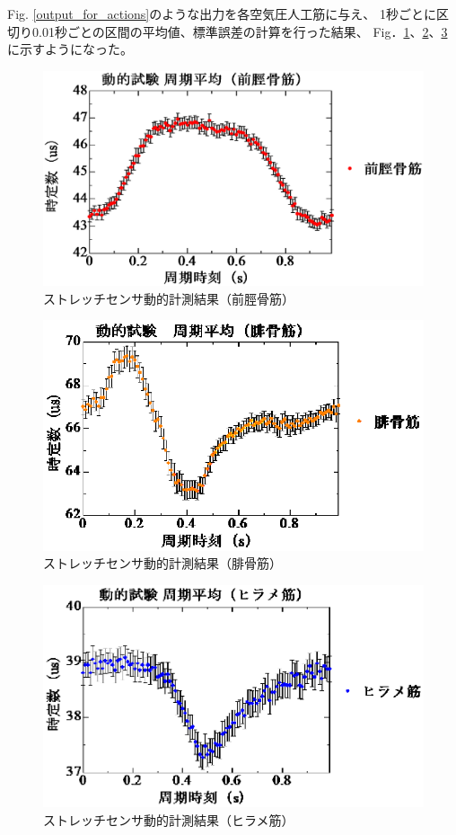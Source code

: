 Fig. \ref{output_for_actions}のような出力を各空気圧人工筋に与え、
1秒ごとに区切り0.01秒ごとの区間の平均値、標準誤差の計算を行った結果、
Fig．\ref{zenkei_action}、\ref{hikotsu_action}、\ref{hirame_action}に示すようになった。
\begin{figure}[h]
  \begin{center}
  \includegraphics[width=0.75\columnwidth,clip]{./4_consideration/moving/zenkei.eps}
  \caption{ストレッチセンサ動的計測結果（前脛骨筋）}
  \label{zenkei_action}
  \end{center}
\end{figure}
\begin{figure}[h]
  \begin{center}
  \includegraphics[width=0.75\columnwidth,clip]{./4_consideration/moving/hikotsu.eps}
  \caption{ストレッチセンサ動的計測結果（腓骨筋）}
  \label{hikotsu_action}
  \end{center}
\end{figure}

\clearpage

\begin{figure}[h]
  \begin{center}
  \includegraphics[width=0.75\columnwidth,clip]{./4_consideration/moving/hirame.eps}
  \caption{ストレッチセンサ動的計測結果（ヒラメ筋）}
  \label{hirame_action}
  \end{center}
\end{figure}

